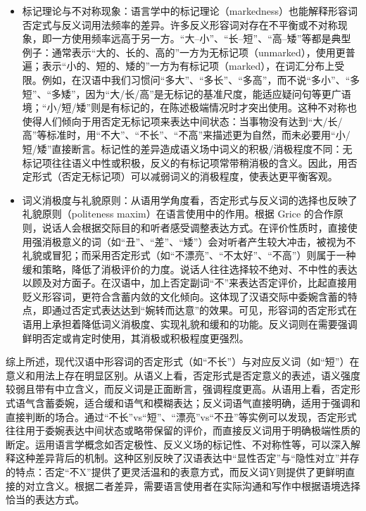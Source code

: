 \documentclass[10pt]{ctexart}
\begin{document}
\begin{enumerate}
\begin{itemize}
        \item 标记理论与不对称现象：语言学中的标记理论（markedness）也能解释形容词否定式与反义词用法频率的差异。许多反义形容词对存在不平衡或不对称现象，即一方使用频率远高于另一方。``大–小''、``长–短''、``高–矮''等都是典型例子：通常表示``大的、长的、高的''一方为无标记项（unmarked），使用更普遍；表示``小的、短的、矮的''一方为有标记项（marked），在词汇分布上受限。例如，在汉语中我们习惯问``多大''、``多长''、``多高''，而不说``多小''、``多短''、``多矮''，因为``大/长/高''是无标记的基准尺度，能适应疑问句等更广语境；``小/短/矮''则是有标记的，在陈述极端情况时才突出使用。这种不对称也使得人们倾向于用否定无标记项来表达中间状态：当事物没有达到``大/长/高''等标准时，用``不大''、``不长''、``不高''来描述更为自然，而未必要用``小/短/矮''直接断言。标记性的差异造成语义场中词义的积极/消极程度不同：无标记项往往语义中性或积极，反义的有标记项常带稍消极的含义。因此，用否定形式（否定无标记项）可以减弱词义的消极程度，使表达更平衡客观。
        
        \item 词义消极度与礼貌原则：从语用学角度看，否定形式与反义词的选择也反映了礼貌原则（politeness maxim）在语言使用中的作用。根据 Grice 的合作原则，说话人会根据交际目的和听者感受调整表达方式。在评价性质时，直接使用强消极意义的词（如``丑''、``差''、``矮''）会对听者产生较大冲击，被视为不礼貌或冒犯；而采用否定形式（如``不漂亮''、``不太好''、``不高''）则属于一种缓和策略，降低了消极评价的力度。说话人往往选择较不绝对、不中性的表达以顾及对方面子。在汉语中，加上否定副词``不''来表达否定评价，比起直接用贬义形容词，更符合含蓄内敛的文化倾向。这体现了汉语交际中委婉含蓄的特点，即通过否定式表达达到``婉转而达意''的效果。可见，形容词的否定形式在语用上承担着降低词义消极度、实现礼貌和缓和的功能。反义词则在需要强调鲜明否定或肯定时使用，其消极或积极程度更强烈。
    \end{itemize}
\end{enumerate}

综上所述，现代汉语中形容词的否定形式（如``不长''）与对应反义词（如``短''）在意义和用法上存在明显区别。从语义上看，否定形式是否定意义的表述，语义强度较弱且带有中立含义，而反义词是正面断言，强调程度更高。从语用上看，否定形式语气含蓄委婉，适合缓和语气和模糊表达；反义词语气直接明确，适用于强调和直接判断的场合。通过``不长''vs``短''、``漂亮''vs``不丑''等实例可以发现，否定形式往往用于委婉表达中间状态或略带保留的评价，而直接反义词用于明确极端性质的断定。运用语言学概念如否定极性、反义义场的标记性、不对称性等，可以深入解释这种差异背后的机制。这种区别反映了汉语表达中``显性否定''与``隐性对立''并存的特点：否定``不X''提供了更灵活温和的表意方式，而反义词Y则提供了更鲜明直接的对立含义。根据二者差异，需要语言使用者在实际沟通和写作中根据语境选择恰当的表达方式。
\end{document}
